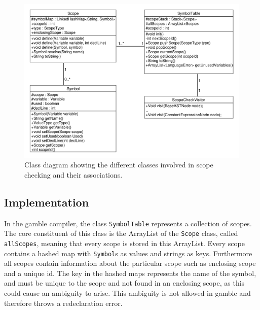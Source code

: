 \begin{figure}
\centering
\includegraphics[width=1\textwidth]{figures/ClassDiagrams/ScopeCheck.pdf}
\caption{Class diagram showing the different classes involved in scope checking and their associations.}
\label{fig:scopeCheck}
\end{figure}


\subsection*{Implementation}
In the \gls{gamble} compiler, the class \texttt{SymbolTable} represents a collection of scopes.
The core constituent of this class is the ArrayList of the \texttt{Scope} class, called \texttt{allScopes}, meaning that every scope is stored in this ArrayList.
Every scope contains a hashed map with \texttt{Symbol}s as values and strings as keys.
Furthermore all scopes contain information about the particular scope such as enclosing scope and a unique id. 
The key in the hashed maps represents the name of the symbol, and must be unique to the scope and not found in an enclosing scope, as this could cause an ambiguity to arise.
This ambiguity is not allowed in \gls{gamble} and therefore throws a redeclaration error.


